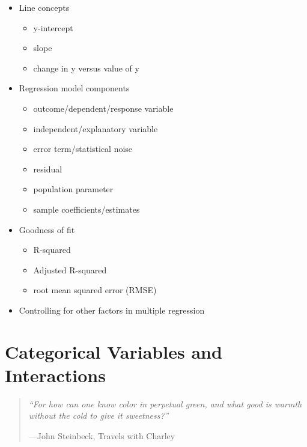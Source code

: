 \documentclass[
]{book}
\providecommand{\tightlist}{%
  \setlength{\itemsep}{0pt}\setlength{\parskip}{0pt}}
\newenvironment{learncheck}%
{%
  \par\vspace{\baselineskip}\noindent 
  \color{Exercise}\begin{itshape}%
  \par\vspace{\baselineskip}\noindent\ignorespaces 
}%
{%
  \end{itshape}\ignorespacesafterend 
}
\begin{document}
\begin{learncheck}
\begin{itemize}
\tightlist
\item
  Line concepts

  \begin{itemize}
  \tightlist
  \item
    y-intercept
  \item
    slope
  \item
    change in y versus value of y
  \end{itemize}
\item
  Regression model components

  \begin{itemize}
  \tightlist
  \item
    outcome/dependent/response variable
  \item
    independent/explanatory variable
  \item
    error term/statistical noise
  \item
    residual
  \item
    population parameter
  \item
    sample coefficients/estimates
  \end{itemize}
\item
  Goodness of fit

  \begin{itemize}
  \tightlist
  \item
    R-squared
  \item
    Adjusted R-squared
  \item
    root mean squared error (RMSE)
  \end{itemize}
\item
  Controlling for other factors in multiple regression
\end{itemize}
\end{learncheck}

\hypertarget{categorical-variables-and-interactions}{%
\chapter{Categorical Variables and Interactions}\label{categorical-variables-and-interactions}}

\begin{quote}
\emph{``For how can one know color in perpetual green, and what good is warmth without the cold to give it sweetness?''}

---John Steinbeck, Travels with Charley
\end{quote}
\end{document}
